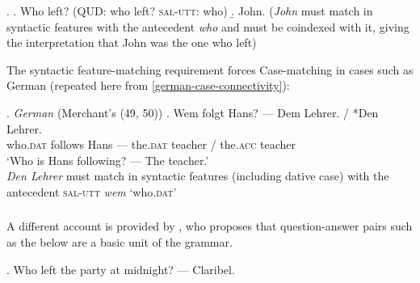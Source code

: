\documentclass[doublespace]{umthesis}
\begin{document}
\ex. 	\a. Who left?	(QUD: who left? \textsc{sal-utt}: who)
	\b. John. ({\it John} must match in syntactic features with the antecedent {\it who} and must be coindexed with it, giving the interpretation that John was the one who left)

The syntactic feature-matching requirement  forces Case-matching in cases such as German (repeated here from \ref{german-case-connectivity}):

\ex. 		{\it German} (Merchant's (49, 50))
		\ag. Wem folgt Hans? --- Dem Lehrer. / *Den Lehrer. \\
			who.\textsc{dat} follows Hans --- the.\textsc{dat} teacher / the.\textsc{acc} teacher \\
			`Who is Hans following? --- The teacher.'\\
			{\it Den Lehrer} must match in syntactic features (including dative case) with the antecedent \textsc{sal-utt} {\it wem} `who.\textsc{dat}'
			


\subsubsection{\cite{Ja13}}\label{sec-jacobson-analysis}

A different account is provided by \cite{Ja13}, who proposes that question-answer pairs such as the below are a basic unit of the grammar.

\ex. 		Who left the party at midnight? --- Claribel.
\end{document}

